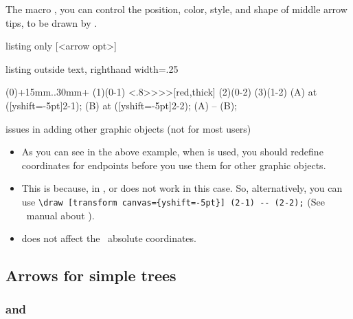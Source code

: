 The macro \icmd{\setxtshowmidarrows}, 
you can control the position, color, style, and shape of middle arrow tips, to be drawn by \cmd{\xtShowMidArrows}.

\begin{tcblisting}{listing only}
  [<arrow opt>]
\end{tcblisting}

\begin{tcblisting}{listing outside text, righthand width=.25\linewidth}
\begin{istgame}
\xtShowMidArrows
\istroot(0)+15mm..30mm+
  \istb \istb \endist
\xtHideMidArrows
\istroot(1)(0-1)  \istb \istb \endist
\xtShowMidArrows
\setxtshowmidarrows<.8>{>>>}[red,thick]
\istroot(2)(0-2)  \istb \istb \endist
{}
\istroot(3)(1-2)  \istb \istb \endist
\coordinate (A) at ([yshift=-5pt]2-1);
\coordinate (B) at ([yshift=-5pt]2-2);
\draw [|-|] (A) -- (B);
\end{istgame}
\end{tcblisting}

\remark issues in adding other graphic objects (not for most users)
\label{page:showarrows}
\begin{itemize}%
\item As you can see in the above example, when \cmd{\xtShowMidArrows} is used, you should redefine coordinates for endpoints before you use them for other graphic objects.
\item This is because, in \Tikz,  or  does not work in this case. So, alternatively, you can use \verb+\draw [transform canvas={yshift=-5pt}] (2-1) -- (2-2);+ (See \TikZ\ manual about ).
\item \cmd{\xtShowArrows} does not affect the \Tikz\ absolute coordinates.
\end{itemize}


\subsection{Arrows for simple trees}

\subsubsection{\protect\cmd{\xtShowArrows} and \protect\cmd{\xtHideArrows}}

